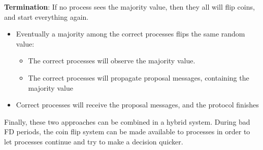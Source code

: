 \documentclass[a4paper,11pt,hidelinks]{article}
\begin{document}
\textbf{Termination}: If no process sees the majority value, then they all will flip coins, and start everything again.
\begin{itemize}
    \item Eventually a majority among the correct processes flips the same random value: \begin{itemize}
              \item The correct processes will observe the majority value.
              \item The correct processes will propagate proposal messages, containing the majority value
          \end{itemize}

    \item Correct processes will receive the proposal messages, and the protocol finishes
\end{itemize}

Finally, these two approaches can be combined in a hybrid system. During bad FD periods, the coin flip system can be made available to processes in order to let processes continue and try to make a decision quicker.

\endgroup

\newpage




\end{document}
